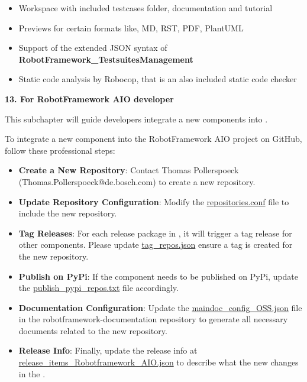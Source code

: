 \begin{itemize}
   \item Workspace with included testcases folder, documentation and tutorial
   \item Previews for certain formats like, MD, RST, PDF, PlantUML
   \item Support of the extended JSON syntax of \textbf{RobotFramework\_TestsuitesManagement}
   \item Static code analysis by Robocop, that is an also included static code checker
\end{itemize}


\textbf{13. For RobotFramework AIO developer}

This subchapter will guide developers integrate a new components into \rfw.  

To integrate a new component into the RobotFramework AIO project on GitHub, follow these professional steps:
\begin{itemize}
   \item \textbf{Create a New Repository}: Contact Thomas Pollerspoeck (Thomas.Pollerspoeck@de.bosch.com) to create a new repository.
   \item \textbf{Update Repository Configuration}: Modify the \href{https://github.com/test-fullautomation/RobotFramework_AIO/blob/develop/config/repositories/repositories.conf}{repositories.conf} file to include the new repository.
   \item \textbf{Tag Releases}: For each release package in \rfw, it will trigger a tag release for other components. Please update \href{https://github.com/test-fullautomation/RobotFramework_AIO/blob/develop/config/repositories/tag_repos.json}{tag_repos.json} ensure a tag is created for the new repository.
   \item \textbf{Publish on PyPi}: If the component needs to be published on PyPi, update the \href{https://github.com/test-fullautomation/RobotFramework_AIO/blob/develop/config/repositories/publish_pypi_repos.txt}{publish_pypi_repos.txt} file accordingly.
   \item \textbf{Documentation Configuration}: Update the \href{https://github.com/test-fullautomation/robotframework-documentation/blob/develop/maindoc/maindoc_configs/maindoc_config_OSS.json}{maindoc_config_OSS.json} file in the robotframework-documentation repository to generate all necessary documents related to the new repository.
   \item \textbf{Release Info}: Finally, update the release info at \href{https://github.com/test-fullautomation/RobotFramework_AIO/blob/develop/config/robotframework_aio/release_items_Robotframework_AIO.json}{release_items_Robotframework_AIO.json} to describe what the new changes in the \rfw.
\end{itemize}

